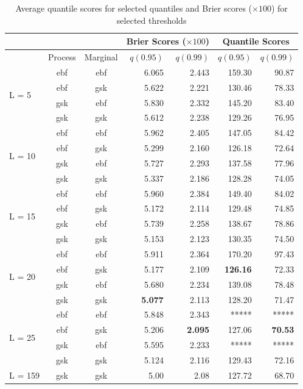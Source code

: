 \documentclass[11pt]{article}
\begin{document}
\begin{table}[htbp]
\caption{Average quantile scores for selected quantiles and Brier scores ($\times 100$) for selected thresholds}
\centering
\small
  \begin{tabular}{lcc|rr|rr}
   \multicolumn{3}{c}{  }& \multicolumn{2}{c|}{Brier Scores ($\times 100$)} & \multicolumn{2}{|c}{Quantile Scores}\\
   \hline
   & Process & Marginal & $q(0.95)$ & $q(0.99)$ & $q(0.95)$ & $q(0.99)$\\
   \hline
  \multirow{4}{*}{L = 5} & ebf & ebf & 6.065 & 2.443 & 159.30 & 90.87 \\
                         & ebf & gsk & 5.622 & 2.221 & 130.46 & 78.33 \\
                         & gsk & ebf & 5.830 & 2.332 & 145.20 & 83.40 \\
                         & gsk & gsk & 5.612 & 2.238 & 129.26 & 76.95 \\
   \hline
  \multirow{4}{*}{L = 10} & ebf & ebf & 5.962 & 2.405 & 147.05 & 84.42 \\
                          & ebf & gsk & 5.299 & 2.160 & 126.18 & 72.64 \\
                          & gsk & ebf & 5.727 & 2.293 & 137.58 & 77.96 \\
                          & gsk & gsk & 5.337 & 2.186 & 128.28 & 74.05 \\
   \hline
  \multirow{4}{*}{L = 15} & ebf & ebf & 5.960 & 2.384 & 149.40 & 84.02 \\
                          & ebf & gsk & 5.172 & 2.114 & 129.48 & 74.85 \\
                          & gsk & ebf & 5.739 & 2.258 & 138.67 & 78.86 \\
                          & gsk & gsk & 5.153 & 2.123 & 130.35 & 74.50 \\
   \hline
  \multirow{4}{*}{L = 20} & ebf & ebf & 5.911 & 2.364 & 170.20 & 97.43 \\
                          & ebf & gsk & 5.177 & 2.109 & \textbf{126.16} & 72.33 \\
                          & gsk & ebf & 5.680 & 2.234 & 139.08 & 78.48 \\
                          & gsk & gsk & \textbf{5.077} & 2.113 & 128.20 & 71.47 \\
   \hline
  \multirow{4}{*}{L = 25} & ebf & ebf & 5.848 & 2.343 & *****  & ***** \\
                          & ebf & gsk & 5.206 & \textbf{2.095} & 127.06 & \textbf{70.53} \\
                          & gsk & ebf & 5.595 & 2.233 & *****  & ***** \\
                          & gsk & gsk & 5.124 & 2.116 & 129.43 & 72.16 \\
  \hline
  L = 159 & gsk & gsk & 5.00 & 2.08 & 127.72 & 68.70 \\
  \hline
	\end{tabular}
\end{table}
\end{document}
